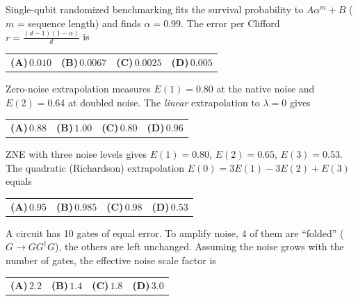 \documentclass[11pt,a4paper]{article}
\newcommand{\optlabel}[1]{\textbf{(#1)}}
\newenvironment{qitem}[1]{\begin{list}{}{\setlength{\leftmargin}{3.3em}\setlength{\labelwidth}{3.1em}%
  \setlength{\labelsep}{0.2em}\setlength{\topsep}{3pt}\setlength{\parsep}{3pt}}\item[\textbf{Q.#1}\hfill]}{\end{list}}
\newcommand{\qsep}{\par\vspace{2pt}{\color{black!15}\hrule}\vspace{4pt}}
\begin{document}
\begin{qitem}{62}
Single-qubit randomized benchmarking fits the survival probability to $A\alpha^m + B$ ($m$ = sequence length) and finds $\alpha = 0.99$. The error per Clifford
$r = \frac{(d - 1)(1 - \alpha)}{d}$ is
\par\smallskip\noindent\begin{tabularx}{\linewidth}{@{}*{4}{L}@{}}
\optlabel{A}\,$0.010$ & \optlabel{B}\,$0.0067$ & \optlabel{C}\,$0.0025$ & \optlabel{D}\,$0.005$
\end{tabularx}
\end{qitem}
\qsep

\begin{qitem}{63}
Zero-noise extrapolation measures $E(1) = 0.80$ at the native noise and $E(2) = 0.64$ at doubled noise. The \emph{linear} extrapolation to $\lambda = 0$ gives
\par\smallskip\noindent\begin{tabularx}{\linewidth}{@{}*{4}{L}@{}}
\optlabel{A}\,$0.88$ & \optlabel{B}\,$1.00$ & \optlabel{C}\,$0.80$ & \optlabel{D}\,$0.96$
\end{tabularx}
\end{qitem}
\qsep

\begin{qitem}{64}
ZNE with three noise levels gives $E(1) = 0.80$, $E(2) = 0.65$, $E(3) = 0.53$. The quadratic (Richardson) extrapolation $E(0) = 3E(1) - 3E(2) + E(3)$ equals
\par\smallskip\noindent\begin{tabularx}{\linewidth}{@{}*{4}{L}@{}}
\optlabel{A}\,$0.95$ & \optlabel{B}\,$0.985$ & \optlabel{C}\,$0.98$ & \optlabel{D}\,$0.53$
\end{tabularx}
\end{qitem}
\qsep

\begin{qitem}{65}
A circuit has 10 gates of equal error. To amplify noise, 4 of them are ``folded'' ($G \to GG^\dagger G$), the others are left unchanged. Assuming the noise grows with
the number of gates, the effective noise scale factor is
\par\smallskip\noindent\begin{tabularx}{\linewidth}{@{}*{4}{L}@{}}
\optlabel{A}\,$2.2$ & \optlabel{B}\,$1.4$ & \optlabel{C}\,$1.8$ & \optlabel{D}\,$3.0$
\end{tabularx}
\end{qitem}
\qsep
\end{document}
